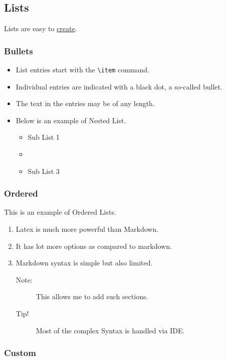 \documentclass{report}[a4paper,12pt] %
\begin{document}
\newpage
\subsection{Lists}
Lists are easy to \href{https://www.overleaf.com/learn/latex/Lists}{create}.

\subsubsection{Bullets}
\begin{itemize}
  \label{lst:bullet}
  \item List entries start with the \verb|\item| command.
  \item Individual entries are indicated with a black dot, a so-called bullet.
  \item The text in the entries may be of any length.
  \item Below is an example of Nested List.
  \begin{itemize}
    \item Sub List 1
    \item \lipsum[1]
    \item Sub List 3
  \end{itemize}
\end{itemize}

\subsubsection{Ordered}
This is an example of Ordered Lists.

\begin{enumerate}[label=(\roman*)]
  \label{lst:order}
  \item Latex is much more powerful than Markdown.
  \item It has lot more options as compared to markdown.
  \item Markdown syntax is simple but also limited.
  \begin{description}
    \item[Note:] This allows me to add such sections.
    \item[Tip!] Most of the complex Syntax is handled via IDE.
  \end{description}
\end{enumerate}

\subsubsection{Custom}
\end{document}
